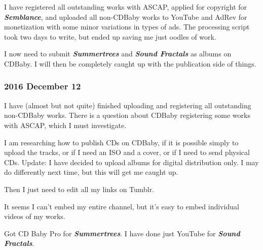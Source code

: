 \documentclass[english,11pt,letterpaper,onecolumn]{scrartcl}
\begin{document}
I have registered all outstanding works with ASCAP, applied for copyright for \emph{\textbf{Semblance}}, and uploaded all non-CDBaby works to YouTube and AdRev for monetization with some minor variations in types of ads. The processing script took two days to write, but ended up saving me just oodles of work.

I now need to submit \emph{\textbf{Summertrees}} and \emph{\textbf{Sound Fractals}} as albums on CDBaby. I will then be completely caught up with the publication side of things.

\subsubsection*{2016 December 12}

I have (almost but not quite) finished uploading and registering all outstanding non-CDBaby works. There is a question about CDBaby registering some works with ASCAP, which I must investigate.

I am researching how to publish CDs on CDBaby, if it is possible simply to upload the tracks, or if I need an ISO and a cover, or if I need to send physical CDs. Update: I have decided to upload albums for digital distribution only. I may do differently next time, but this will get me caught up.

Then I just need to edit all my links on Tumblr.

It seems I can't embed my entire channel, but it's easy to embed individual videos of my works.

Got CD Baby Pro for \emph{\textbf{Summertrees}}. I have done just YouTube for \emph{\textbf{Sound Fractals}}.
\end{document}
